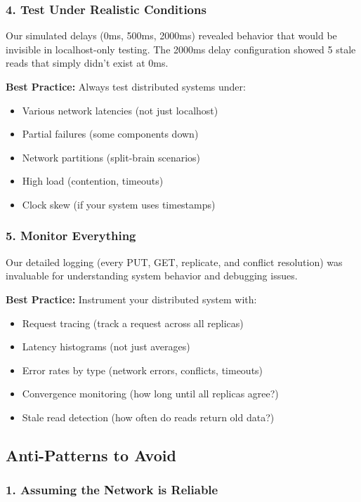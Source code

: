 \documentclass[10pt,a4paper]{article}
\begin{document}
\subsubsection{4. Test Under Realistic Conditions}

Our simulated delays (0ms, 500ms, 2000ms) revealed behavior that would be invisible in localhost-only testing. The 2000ms delay configuration showed 5 stale reads that simply didn't exist at 0ms.

\textbf{Best Practice:} Always test distributed systems under:
\begin{itemize}
    \item Various network latencies (not just localhost)
    \item Partial failures (some components down)
    \item Network partitions (split-brain scenarios)
    \item High load (contention, timeouts)
    \item Clock skew (if your system uses timestamps)
\end{itemize}

\subsubsection{5. Monitor Everything}

Our detailed logging (every PUT, GET, replicate, and conflict resolution) was invaluable for understanding system behavior and debugging issues.

\textbf{Best Practice:} Instrument your distributed system with:
\begin{itemize}
    \item Request tracing (track a request across all replicas)
    \item Latency histograms (not just averages)
    \item Error rates by type (network errors, conflicts, timeouts)
    \item Convergence monitoring (how long until all replicas agree?)
    \item Stale read detection (how often do reads return old data?)
\end{itemize}

\subsection{Anti-Patterns to Avoid}

\subsubsection{1. Assuming the Network is Reliable}
\end{document}

